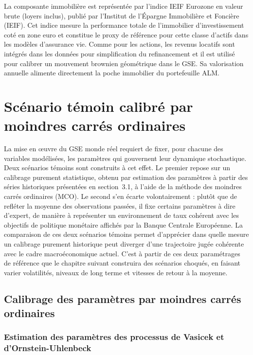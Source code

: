 \begin{itemize}
    La composante immobilière est représentée par l'indice IEIF Eurozone en valeur brute (loyers inclus), publié par l'Institut de l'Épargne Immobilière et Foncière (IEIF). Cet indice mesure la performance totale de l'immobilier d'investissement coté en zone euro et constitue le proxy de référence pour cette classe d'actifs dans les modèles d'assurance vie. Comme pour les actions, les revenus locatifs sont intégrés dans les données pour simplification du refinancement et il est utilisé pour calibrer un mouvement brownien géométrique dans le GSE. Sa valorisation annuelle alimente directement la poche immobilier du portefeuille ALM.
\end{itemize}


\section{Scénario témoin calibré par moindres carrés ordinaires}

La mise en œuvre du GSE monde réel requiert de fixer, pour chacune des variables modélisées, les paramètres qui gouvernent leur dynamique stochastique. Deux scénarios témoins sont construits à cet effet. Le premier repose sur un calibrage purement statistique, obtenu par estimation des paramètres à partir des séries historiques présentées en section~3.1, à l'aide de la méthode des moindres carrés ordinaires (MCO). Le second s'en écarte volontairement : plutôt que de refléter la moyenne des observations passées, il fixe certains paramètres à dire d'expert, de manière à représenter un environnement de taux cohérent avec les objectifs de politique monétaire affichés par la Banque Centrale Européenne. La comparaison de ces deux scénarios témoins permet d'apprécier dans quelle mesure un calibrage purement historique peut diverger d'une trajectoire jugée cohérente avec le cadre macroéconomique actuel. C'est à partir de ces deux paramétrages de référence que le chapitre suivant construira des scénarios choqués, en faisant varier volatilités, niveaux de long terme et vitesses de retour à la moyenne.

\subsection{Calibrage des paramètres par moindres carrés ordinaires}

\subsubsection{Estimation des paramètres des processus de Vasicek et d'Ornstein-Uhlenbeck}

